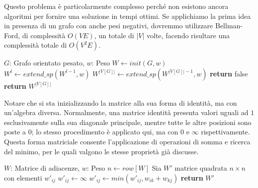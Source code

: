 \noindent Questo problema è particolarmente complesso perché non esistono ancora algoritmi per fornire una soluzione in tempi ottimi. Se applichiamo la
prima idea in presenza di un grafo con anche pesi negativi, dovremmo utilizzare Bellman-Ford, di complessità $O(VE)$, un totale di $|V|$ volte,
facendo risultare una complessità totale di $O(V^2E)$.

\begin{algorithm}[h]
	\caption{all\_pairs\_sp(G, w)}
	\begin{algorithmic}[i]
		\Require $G$: Grafo orientato pesato, $w$: Peso
		\State $W\gets init(G, w)$ 
		 
		\State $W^l\gets extend\_sp(W^{l-1}, w)$ 
		\EndFor
		\State $W^{|V[G]|}\gets extend\_sp(W^{|V[G]|-1}, w)$
		 
		\State \textbf{return} false
		\EndIf
		\State \textbf{return} $W^{|V[G]|}$
	\end{algorithmic}
\end{algorithm}

\noindent Notare che si sta inizializzando la matrice alla sua forma di identità, ma con un'algebra diversa. Normalmente, una matrice identità presenta
valori uguali ad $1$ esclusivamente sulla sua diagonale principale, mentre tutte le altre posizioni sono poste a $0$; lo stesso procedimento è applicato
qui, ma con $0$ e $\infty$ rispettivamente. Questa forma matriciale consente l'applicazione di operazioni di somma e ricerca del minimo, per le quali
valgono le stesse proprietà già discusse.
\begin{algorithm}[h]
	\caption{extend\_sp(W, w)}
	\begin{algorithmic}[i]
		\Require $W$: Matrice di adiacenze, $w$: Peso
		\State $n\gets row[W]$ 
		\State Sia $W'$ matrice quadrata $n\times n$ con elementi $w'_{ij}$
		\State
		 
		 
		\State $w'_{ij}\gets \infty$ 
		\State
		 
		\State $w'_{ij}\gets min(w'_{ij}, w_{ik}+w_{kj})$ 
		\EndFor
		\EndFor
		\EndFor
		\State \textbf{return} $W'$ 
	\end{algorithmic}
\end{algorithm}

